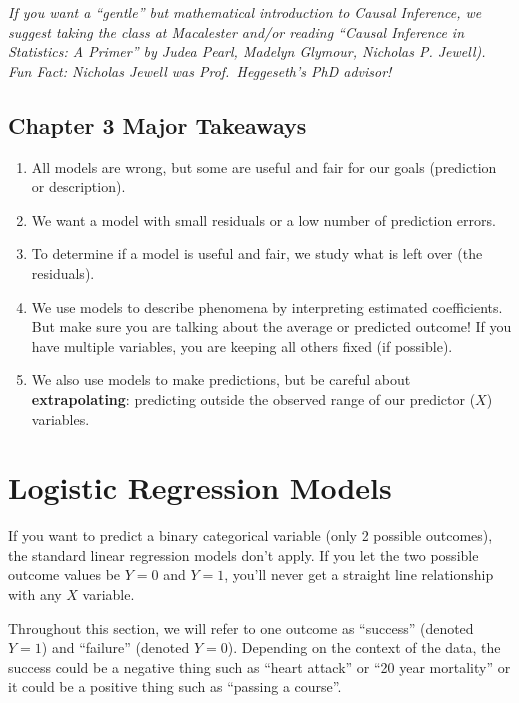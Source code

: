 \documentclass[
]{book}
\begin{document}
\emph{If you want a ``gentle'' but mathematical introduction to Causal Inference, we suggest taking the class at Macalester and/or reading ``Causal Inference in Statistics: A Primer'' by Judea Pearl, Madelyn Glymour, Nicholas P. Jewell). Fun Fact: Nicholas Jewell was Prof.~Heggeseth's PhD advisor!}

\hypertarget{chapter-3-major-takeaways}{%
\section{Chapter 3 Major Takeaways}\label{chapter-3-major-takeaways}}

\begin{enumerate}
\def\labelenumi{\arabic{enumi}.}
\item
  All models are wrong, but some are useful and fair for our goals (prediction or description).
\item
  We want a model with small residuals or a low number of prediction errors.
\item
  To determine if a model is useful and fair, we study what is left over (the residuals).
\item
  We use models to describe phenomena by interpreting estimated coefficients. But make sure you are talking about the average or predicted outcome! If you have multiple variables, you are keeping all others fixed (if possible).
\item
  We also use models to make predictions, but be careful about \textbf{extrapolating}: predicting outside the observed range of our predictor (\(X\)) variables.
\end{enumerate}

\hypertarget{logistic}{%
\chapter{Logistic Regression Models}\label{logistic}}

If you want to predict a binary categorical variable (only 2 possible outcomes), the standard linear regression models don't apply. If you let the two possible outcome values be \(Y=0\) and \(Y=1\), you'll never get a straight line relationship with any \(X\) variable.

Throughout this section, we will refer to one outcome as ``success'' (denoted \(Y=1\)) and ``failure'' (denoted \(Y=0\)). Depending on the context of the data, the success could be a negative thing such as ``heart attack'' or ``20 year mortality'' or it could be a positive thing such as ``passing a course''.
\end{document}
